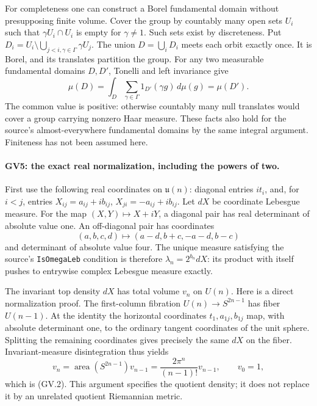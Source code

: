 For completeness one can construct a Borel fundamental domain without
presupposing finite volume. Cover the group by countably many open
sets $U_i$ such that $\gamma U_i\cap U_i$ is empty for
$\gamma\ne1$. Such sets exist by discreteness. Put
$D_i=U_i\setminus\bigcup_{j<i,\gamma\in\Gamma}\gamma U_j$.
The union $D=\bigcup_iD_i$ meets each orbit exactly once. It is Borel,
and its translates partition the group. For any two measurable
fundamental domains $D,D'$, Tonelli and left invariance give
\[
 \mu(D)=\int_D\sum_{\gamma\in\Gamma}1_{D'}(\gamma g)\,d\mu(g)
       =\mu(D').
 \tag{GV.7}
\]
The common value is positive: otherwise countably many null translates
would cover a group carrying nonzero Haar measure. These facts also
hold for the source's almost-everywhere fundamental domains by the
same integral argument. Finiteness has not been assumed here.

\paragraph{GV5: the exact real normalization, including the powers of two.}
First use the following real coordinates on $\mathfrak u(n)$:
diagonal entries $it_i$, and, for $i<j$, entries
$X_{ij}=a_{ij}+ib_{ij}$, $X_{ji}=-a_{ij}+ib_{ij}$.
Let $dX$ be coordinate Lebesgue measure. For the map
$(X,Y)\mapsto X+iY$, a diagonal pair has real determinant of absolute
value one. An off-diagonal pair has coordinates
\[
 (a,b,c,d)\longmapsto(a-d,b+c,-a-d,b-c)
 \tag{GV.8}
\]
and determinant of absolute value four. The unique measure satisfying
the source's \texttt{IsOmegaLeb} condition is therefore
$\lambda_n=2^{b_n}dX$: its product with itself pushes to entrywise
complex Lebesgue measure exactly.

The invariant top density $dX$ has total volume $v_n$ on $U(n)$.
Here is a direct normalization proof. The first-column fibration
$U(n)\to S^{2n-1}$ has fiber $U(n-1)$. At the identity the horizontal
coordinates $t_1,a_{1j},b_{1j}$ map, with absolute determinant one,
to the ordinary tangent coordinates of the unit sphere. Splitting
the remaining coordinates gives precisely the same $dX$ on the
fiber. Invariant-measure disintegration thus yields
\[
 v_n=\operatorname{area}(S^{2n-1})v_{n-1}
     =\frac{2\pi^n}{(n-1)!}v_{n-1},\qquad v_0=1,
 \tag{GV.9}
\]
which is (GV.2). This argument specifies the quotient density; it
does not replace it by an unrelated quotient Riemannian metric.

